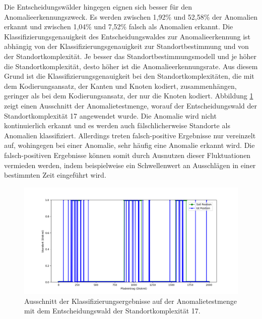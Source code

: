 \newpage
Die Entscheidungswälder hingegen eignen sich besser für den Anomalieerkennungszweck.
Es werden zwischen 1,92\% und 52,58\% der Anomalien erkannt und zwischen 1,04\% und 7,52\% falsch als Anomalien erkannt.
Die Klassifizierungsgenauigkeit des Entscheidungswaldes zur Anomalieerkennung ist abhängig von der Klassifizierungsgenauigkeit zur Standortbestimmung
und von der Standortkomplexität.
Je besser das Standortbestimmungsmodell und je höher die Standortkomplexität, desto höher ist die Anomalieerkennungsrate.
Aus diesem Grund ist die Klassifizierungsgenauigkeit bei den Standortkomplexitäten, die mit dem Kodierungsansatz, der Kanten und Knoten kodiert, zusammenhängen,
geringer als bei dem Kodierungsansatz, der nur die Knoten kodiert.
\newline
\newline
Abbildung \ref{fig:true_vs_predicted_anomaly} zeigt einen Ausschnitt der Anomalietestmenge, worauf der Entscheidungswald der Standortkomplexität 17 angewendet wurde.
Die Anomalie wird nicht kontinuierlich erkannt und es werden auch fälschlicherweise Standorte als Anomalien klassifiziert.
Allerdings treten falsch-positive Ergebnisse nur vereinzelt auf, wohingegen bei einer Anomalie, sehr häufig eine Anomalie erkannt wird.
Die falsch-positiven Ergebnisse können somit durch Ausnutzen dieser Fluktuationen vermieden werden,
indem beispielweise ein Schwellenwert an Ausschlägen in einer bestimmten Zeit eingeführt wird.
\begin{figure}[h!]
    \centering
    \includegraphics[width=\linewidth]{images/anomaly_true_vs_predicted.png}
    \caption{Ausschnitt der Klassifizierungsergebnisse auf der Anomalietestmenge mit dem Entscheidungswald der Standortkomplexität 17. }
    \label{fig:true_vs_predicted_anomaly}
\end{figure}